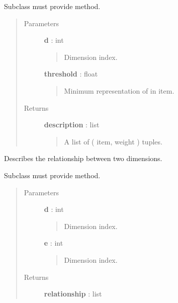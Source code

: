 \documentclass[letterpaper,10pt,english]{sphinxmanual}
\begin{document}
\begin{fulllineitems}
\begin{fulllineitems}
Subclass must provide  method.
\begin{quote}\begin{description}
\item[{Parameters}] \leavevmode
\textbf{d} : int
\begin{quote}

Dimension index.
\end{quote}

\textbf{threshold} : float
\begin{quote}

Minimum representation of  in item.
\end{quote}

\item[{Returns}] \leavevmode
\textbf{description} : list
\begin{quote}

A list of ( item, weight ) tuples.
\end{quote}

\end{description}\end{quote}

\end{fulllineitems}


\begin{fulllineitems}
\label{tethne.model.corpus.ldamodel:tethne.model.corpus.ldamodel.LDAModel.dimension_relationship}
Describes the relationship between two dimensions.

Subclass must provide  method.
\begin{quote}\begin{description}
\item[{Parameters}] \leavevmode
\textbf{d} : int
\begin{quote}

Dimension index.
\end{quote}

\textbf{e} : int
\begin{quote}

Dimension index.
\end{quote}

\item[{Returns}] \leavevmode
\textbf{relationship} : list
\begin{quote}


\end{quote}
\end{description}
\end{quote}
\end{fulllineitems}
\end{fulllineitems}
\end{document}
